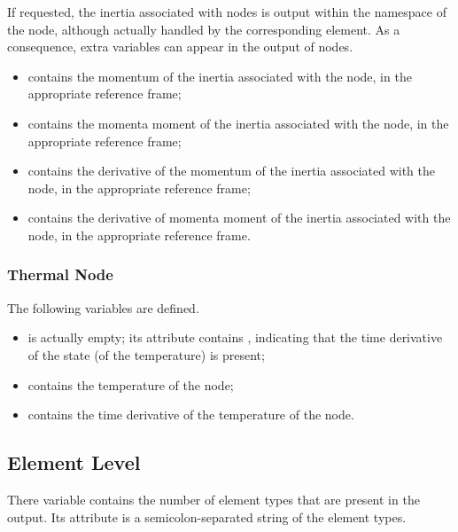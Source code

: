 If requested, the inertia associated with  nodes is output
within the namespace of the node, although actually handled
by the corresponding  element.
As a consequence, extra variables can appear in the output
of  nodes.
\begin{itemize}
\item {} contains the momentum of the inertia
associated with the node, in the appropriate reference frame;

\item {} contains the momenta moment of the inertia
associated with the node, in the appropriate reference frame;

\item {} contains the derivative of the momentum
of the inertia associated with the node, in the appropriate reference frame;

\item {} contains the derivative of momenta moment
of the inertia associated with the node, in the appropriate reference frame.
\end{itemize}


\subsubsection{Thermal Node}
\label{sec:NetCDF:Node:Thermal Node}
The following variables are defined.
\begin{itemize}
\item {} is actually empty; its  attribute contains , indicating that the time derivative of the state (of the temperature) is present;

\item {} contains the temperature of the node;

\item {} contains the time derivative of the temperature of the node.
\end{itemize}


\subsection{Element Level}
There variable  contains the number of element types that are present in the output.
Its attribute  is a semicolon-separated string of the element types.

